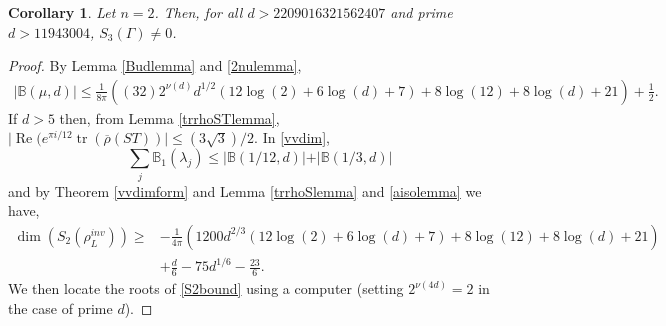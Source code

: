 \documentclass[12pt, a4paper]{article}
\newtheorem{cor}{Corollary}[section]
\newcommand{\BB}{\mathbb{B}}
\newcommand{\opn}{\operatorname}
\begin{document}
\begin{cor}\label{weight3cuspformcor}
  Let $n=2$.
Then, for all $d>2209016321562407$ and prime $d>11943004$,  $S_3(\Gamma) \neq 0$. 
\end{cor}
\begin{proof}
  By Lemma \ref{Budlemma} and \ref{2nulemma},  
  \begin{align*}
    \vert \BB(\mu, d) \vert
    \leq 
    \frac{1}{8 \pi} \left ( (32)2^{\nu(d)}d^{1/2}(12 \opn{log}(2) + 6 \opn{log}(d) + 7) + 8\opn{log}(12) + 8\opn{log}(d) + 21 \right ) + \frac{1}{2}.
  \end{align*}
    If $d>5$ then, from Lemma \ref{trrhoSTlemma}, $\vert \opn{Re}(e^{\pi i / 12} \opn{tr}(\overline{\rho}(ST)) \vert \leq (3 \sqrt{3}) / 2$.
    In \eqref{vvdim},
    \[ 
    \sum_j \BB_1(\lambda_j) \leq \vert \BB(1/12, d) \vert + \vert \BB(1/3, d) \vert
    \] 
    and by Theorem \ref{vvdimform} and Lemma \ref{trrhoSlemma} and \ref{aisolemma} we have,
  \begin{align}\label{S2bound}
    \opn{dim}(S_2(\rho_L^{inv})) 
    \geq &
    - \frac{1}{4 \pi}(1200 d^{2/3}(12 \opn{log}(2) + 6\opn{log}(d) + 7) + 8\opn{log}(12) + 8\opn{log}(d) + 21)
  \nonumber \\
  &
  + \frac{d}{6}
  - 75 d^{1/6}
  - \frac{23}{6}.
  \end{align}
  We then locate the roots of \eqref{S2bound} using a computer (setting $2^{\nu(4d)}=2$ in the case of prime $d$). 
\end{proof}
\end{document}
